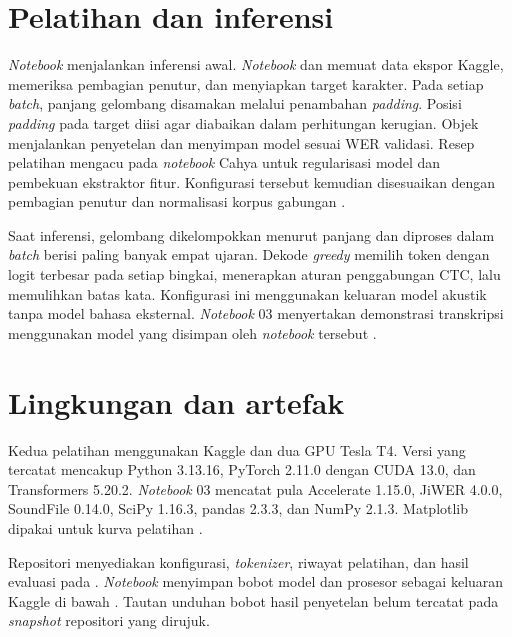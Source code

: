 \clearpage
\section{Pelatihan dan inferensi}

\textit{Notebook}  menjalankan inferensi awal. \textit{Notebook}  dan  memuat data ekspor Kaggle, memeriksa pembagian penutur, dan menyiapkan target karakter. Pada setiap \textit{batch}, panjang gelombang disamakan melalui penambahan \textit{padding}. Posisi \textit{padding} pada target diisi  agar diabaikan dalam perhitungan kerugian. Objek  menjalankan penyetelan dan menyimpan model sesuai WER validasi. Resep pelatihan mengacu pada \textit{notebook} Cahya untuk regularisasi model dan pembekuan ekstraktor fitur. Konfigurasi tersebut kemudian disesuaikan dengan pembagian penutur dan normalisasi korpus gabungan \cite{cahyaresep,transformers,accelerate,repoasr}.

Saat inferensi, gelombang dikelompokkan menurut panjang dan diproses dalam \textit{batch} berisi paling banyak empat ujaran. Dekode \textit{greedy} memilih token dengan logit terbesar pada setiap bingkai, menerapkan aturan penggabungan CTC, lalu memulihkan batas kata. Konfigurasi ini menggunakan keluaran model akustik tanpa model bahasa eksternal. \textit{Notebook} 03 menyertakan demonstrasi transkripsi menggunakan model yang disimpan oleh \textit{notebook} tersebut \cite{repoasr}.

\section{Lingkungan dan artefak}

Kedua pelatihan menggunakan Kaggle dan dua GPU Tesla T4. Versi yang tercatat mencakup Python 3.13.16, PyTorch 2.11.0 dengan CUDA 13.0, dan Transformers 5.20.2. \textit{Notebook} 03 mencatat pula Accelerate 1.15.0, JiWER 4.0.0, SoundFile 0.14.0, SciPy 1.16.3, pandas 2.3.3, dan NumPy 2.1.3. Matplotlib dipakai untuk kurva pelatihan \cite{pytorch,transformers,accelerate,jiwer,soundfile,scipy,pandas,numpy,matplotlib,repoasr}.

Repositori menyediakan konfigurasi, \textit{tokenizer}, riwayat pelatihan, dan hasil evaluasi pada . \textit{Notebook} menyimpan bobot model dan prosesor sebagai keluaran Kaggle di bawah . Tautan unduhan bobot hasil penyetelan belum tercatat pada \textit{snapshot} repositori yang dirujuk.
